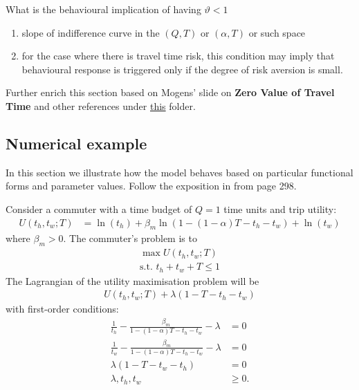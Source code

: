 \documentclass[12pt,a4paper,british]{article}
\begin{document}
{\color{red} {What is the behavioural implication of having $\vartheta<1$}
\begin{enumerate}
    \item slope of indifference curve in the $(Q, T)$ or $(\alpha, T)$ or such space
    \item for the case where there is travel time risk, this condition may imply that behavioural response is triggered only if the degree of risk aversion is small.
\end{enumerate}}


Further enrich this section based on Mogens' slide on \textbf{Zero Value of Travel Time} and other references under \href{C:/Users/deab/Dropbox/Postdoc/automation_scheduling}{this} folder.


\subsection*{Numerical example}

In this section we illustrate how the model behaves based on particular functional forms and parameter values. Follow the exposition in \citet{FosgerauSmall2017EndogenousSchedulingPreferences} from page 298.

Consider a commuter with a time budget of $Q=1$ time units and trip utility:
\begin{align*}
U\left(t_{h},t_{w};T\right) & =\ln\left(t_{h}\right)+\beta_{m}\ln\left(1-\left(1-\alpha\right)T-t_{h}-t_{w}\right)+\ln\left(t_{w}\right)
\end{align*}
where $\beta_{m}>0$. The commuter's problem is to 
\begin{gather*}
\max U\left(t_{h},t_{w};T\right)\\
\mbox{s.t. }t_{h}+t_{w}+T\leq1
\end{gather*}
The Lagrangian of the utility maximisation problem will be
\begin{gather*}
U\left(t_{h},t_{w};T\right)+\lambda\left(1-T-t_{h}-t_{w}\right)
\end{gather*}
with first-order conditions:
\begin{align*}
\frac{1}{t_{h}}-\frac{\beta_{m}}{1-\left(1-\alpha\right)T-t_{h}-t_{w}}-\lambda & =0\\
\frac{1}{t_{w}}-\frac{\beta_{m}}{1-\left(1-\alpha\right)T-t_{h}-t_{w}}-\lambda & =0\\
\lambda\left(1-T-t_{w}-t_{h}\right) & =0\\
\lambda,t_{h},t_{w} & \geq0.
\end{align*}
\end{document}
